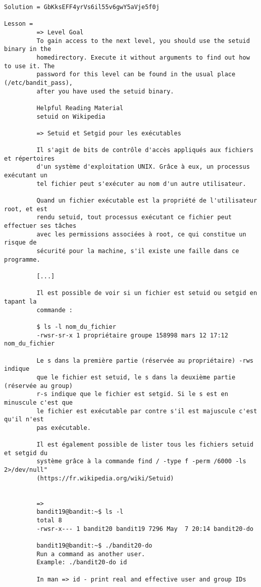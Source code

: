 \documentclass[a4paper]{report}
\begin{document}
\begin{verbatim}
Solution = GbKksEFF4yrVs6il55v6gwY5aVje5f0j

Lesson = 
		 => Level Goal
		 To gain access to the next level, you should use the setuid binary in the
		 homedirectory. Execute it without arguments to find out how to use it. The
		 password for this level can be found in the usual place (/etc/bandit_pass),
		 after you have used the setuid binary.
		 
		 Helpful Reading Material
		 setuid on Wikipedia
		 
		 => Setuid et Setgid pour les exécutables
		 
		 Il s'agit de bits de contrôle d'accès appliqués aux fichiers et répertoires 
		 d'un système d'exploitation UNIX. Grâce à eux, un processus exécutant un 
		 tel fichier peut s'exécuter au nom d'un autre utilisateur.
		 
		 Quand un fichier exécutable est la propriété de l'utilisateur root, et est 
		 rendu setuid, tout processus exécutant ce fichier peut effectuer ses tâches 
		 avec les permissions associées à root, ce qui constitue un risque de 
		 sécurité pour la machine, s'il existe une faille dans ce programme.
		 
		 [...]
		 
		 Il est possible de voir si un fichier est setuid ou setgid en tapant la 
		 commande :
		 
		 $ ls -l nom_du_fichier
		 -rwsr-sr-x 1 propriétaire groupe 158998 mars 12 17:12 nom_du_fichier
		 
		 Le s dans la première partie (réservée au propriétaire) -rws indique 
		 que le fichier est setuid, le s dans la deuxième partie (réservée au group) 
		 r-s indique que le fichier est setgid. Si le s est en minuscule c'est que 
		 le fichier est exécutable par contre s'il est majuscule c'est qu'il n'est 
		 pas exécutable.
		 
		 Il est également possible de lister tous les fichiers setuid et setgid du
		 système grâce à la commande find / -type f -perm /6000 -ls 2>/dev/null"
		 (https://fr.wikipedia.org/wiki/Setuid)


		 =>
		 bandit19@bandit:~$ ls -l
		 total 8
		 -rwsr-x--- 1 bandit20 bandit19 7296 May  7 20:14 bandit20-do
		 
		 bandit19@bandit:~$ ./bandit20-do 
		 Run a command as another user.
		 Example: ./bandit20-do id

		 In man => id - print real and effective user and group IDs


\end{verbatim}
\end{document}
